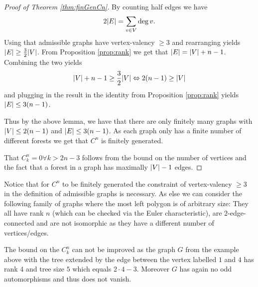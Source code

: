 \begin{proof}[Proof of Theorem \ref{thm:finGenCn}]
	By counting half edges we have
	\[
		2 \abs{E} = \sum_{v \in V} \deg{v}
	.\] 
	Using that admissible graphs have vertex-valency $\geq 3$ and rearranging yields $\abs{E} \geq \frac{3}{2} \abs{V}$.
	From Proposition \ref{prop:rank} we get that $\abs{E} = \abs{V} + n-1$.
	Combining the two yields
	\[
		\abs{V} + n -1 \geq \frac{3}{2} \abs{V} \Leftrightarrow 2 (n-1) \geq \abs{V}
	\] 
	and plugging in the result in the identity from Proposition \ref{prop:rank} yields $\abs{E} \leq 3 (n-1)$.

	Thus by the above lemma, we have that there are only finitely many graphs with $\abs{V} \leq 2 (n-1)$ and $\abs{E} \leq 3(n-1)$.
	As each graph only has a finite number of different forests we get that $C^{n}$ is finitely generated.

	That $C_{k}^{n} = 0 \forall k > 2n -3$ follows from the bound on the number of vertices and the fact that a forest in a graph has maximally $\abs{V} - 1$ edges.
\end{proof}

\begin{remark}
	Notice that for $C^{n}$ to be finitely generated the constraint of vertex-valency $\geq 3$ in the definition of admissible graphs is necessary.
	As else we can consider the following family of graphs where the most left polygon is of arbitrary size:
	They all have rank $n$ (which can be checked via the Euler characteristic), are $2$-edge-connected and are not isomorphic as they have a different number of vertices/edges.
\end{remark}

\begin{remark}
	The bound on the $C_{k}^{n}$ can not be improved as the graph $G$ from the example above with the tree extended by the edge between the vertex labelled $1$ and $4$ has rank $4$ and
	tree size $5$ which equals $2 \cdot 4 - 3$. Moreover $G$ has again no odd automorphisms and thus does not vanish.
\end{remark}

